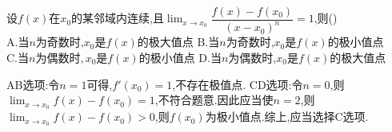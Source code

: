 \documentclass[8pt a4paper, oneside, UTF8]{ctexbook}  %
\begin{document}
\begin{sloppypar}
\begin{solution}
    \end{solution}
    \begin{problem}
    设$f(x)$在$x_{0}$的某邻域内连续,且$\operatorname*{lim}_{x\to x_{0}}\dfrac{f(x)-f(x_{0})}{(x-x_{0})^{n}}=1$,则()\\
    A.当$n$为奇数时,$x_{0}$是$f(x)$的极大值点\quad
    B.当$n$为奇数时,$x_{0}$是$f(x)$的极小值点\\
    C.当$n$为偶数时$,x_{0}$是$f(x)$的极小值点\quad
    D.当$n$为偶数时,$x_{0}$是$f(x)$的极大值点
    \end{problem}
    \begin{solution}
        AB选项:令$n=1$可得,$f'(x_0)=1$,不存在极值点. CD选项:令$n=0$,则$\lim_{x\to x_0}f(x)-f(x_0)=1$,不符合题意.因此应当使$n=2$,则$\lim_{x\to x_0}f(x)-f(x_0)>0$,则$f(x_0)$为极小值点.综上,应当选择C选项.
    \end{solution}

\end{sloppypar}
\end{document}
